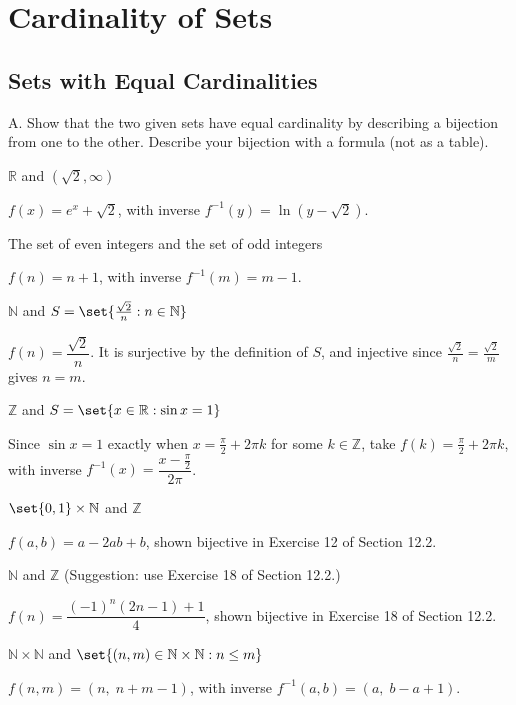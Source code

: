 \documentclass[DIN, pagenumber=false, fontsize=11pt, parskip=half]{scrartcl}
\title{}
\author{} %
\date{}
\begin{document}
\maketitle

\setcounter{section}{12}

\section{Cardinality of Sets}

\subsection{Sets with Equal Cardinalities}

\begin{exercise}{A.}
    Show that the two given sets have equal cardinality by describing a bijection from one to the other. Describe your bijection with a formula (not as a table).
\end{exercise}

\begin{problems}
    \problem $\mathbb{R}$ and $(\sqrt{2},\infty)$

    \answer $f(x) = e^x + \sqrt{2}$, with inverse $f^{-1}(y) = \ln(y - \sqrt{2})$.

    \problem The set of even integers and the set of odd integers

    \answer $f(n) = n+1$, with inverse $f^{-1}(m) = m-1$.

    \problem $\mathbb{N}$ and $S = \set{\frac{\sqrt{2}}{n} : n \in \mathbb{N}}$

    \answer $f(n) = \dfrac{\sqrt{2}}{n}$. It is surjective by the definition of $S$, and injective since $\frac{\sqrt{2}}{n} = \frac{\sqrt{2}}{m}$ gives $n = m$.

    \problem $\mathbb{Z}$ and $S = \set{x \in \mathbb{R} : \sin{x} = 1}$

    \answer Since $\sin{x} = 1$ exactly when $x = \frac{\pi}{2} + 2\pi k$ for some $k \in \mathbb{Z}$, take $f(k) = \frac{\pi}{2} + 2\pi k$, with inverse $f^{-1}(x) = \dfrac{x - \frac{\pi}{2}}{2\pi}$.

    \problem $\set{0,1} \times \mathbb{N}$ and $\mathbb{Z}$

    \answer $f(a,b) = a - 2ab + b$, shown bijective in Exercise 12 of Section 12.2.

    \problem $\mathbb{N}$ and $\mathbb{Z}$ (Suggestion: use Exercise 18 of Section 12.2.)

    \answer $f(n) = \dfrac{(-1)^n(2n-1)+1}{4}$, shown bijective in Exercise 18 of Section 12.2.

    \problem $\mathbb{N} \times \mathbb{N}$ and $\set{(n,m) \in \mathbb{N} \times \mathbb{N} : n \leq m}$

    \answer $f(n,m) = (n,\; n+m-1)$, with inverse $f^{-1}(a,b) = (a,\; b-a+1)$.
\end{problems}
\end{document}
